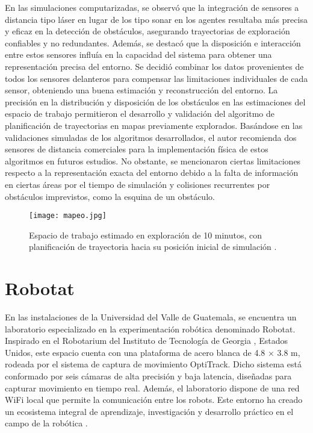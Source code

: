 En las simulaciones computarizadas, se observó que la integración de sensores a distancia tipo láser en lugar de los tipo sonar en los agentes resultaba más precisa y eficaz en la detección de obstáculos, asegurando trayectorias de exploración confiables y no redundantes. Además, se destacó que la disposición e interacción entre estos sensores influía en la capacidad del sistema para obtener una representación precisa del entorno. Se decidió combinar los datos provenientes de todos los sensores delanteros para compensar las limitaciones individuales de cada sensor, obteniendo una buena estimación y reconstrucción del entorno. La precisión en la distribución y disposición de los obstáculos en las estimaciones del espacio de trabajo permitieron el desarrollo y validación del algoritmo de planificación de trayectorias en mapas previamente explorados. Basándose en las validaciones simuladas de los algoritmos desarrollados, el autor recomienda dos sensores de distancia comerciales para la implementación física de estos algoritmos en futuros estudios. No obstante, se mencionaron ciertas limitaciones respecto a la representación exacta del entorno debido a la falta de información en ciertas áreas por el tiempo de simulación y colisiones recurrentes por obstáculos imprevistos, como la esquina de un obstáculo. 

\begin{figure}[H]
	\centering
	\texttt{[image: mapeo.jpg]}
	\caption{Espacio de trabajo estimado en exploración de 10 minutos, con planificación de trayectoria hacia su posición inicial de simulación  \cite{godoy_lucero_desarrollo_2023}.}
	\label{fig2_9}
\end{figure}

\section{Robotat}
En las instalaciones de la Universidad del Valle de Guatemala, se encuentra un laboratorio especializado en la experimentación robótica denominado Robotat. Inspirado en el Robotarium del Instituto de Tecnología de Georgia \cite{maderer_robotarium_nodate}, Estados Unidos, este espacio cuenta con una plataforma de acero blanca de 4.8 × 3.8 m, rodeada por el sistema de captura de movimiento OptiTrack. Dicho sistema está conformado por seis cámaras de alta precisión y baja latencia, diseñadas para capturar movimiento en tiempo real. Además, el laboratorio dispone de una red WiFi local que permite la comunicación entre los robots. Este entorno ha creado un ecosistema integral de aprendizaje, investigación y desarrollo práctico en el campo de la robótica \cite{barrera_robotat_nodate}.

